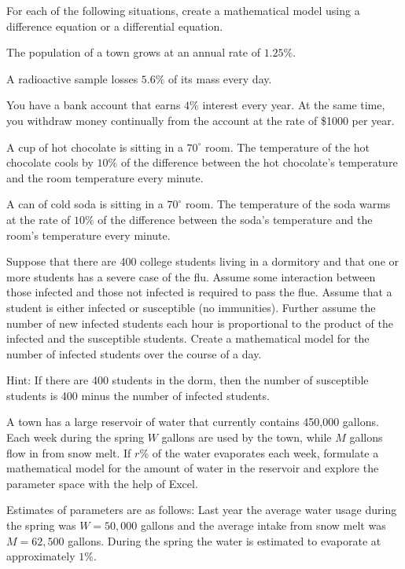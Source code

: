 \begin{problem}
    For each of the following situations, create a mathematical model using a difference
    equation or a differential equation.
\ba
\item The population of a town grows at an annual rate of $1.25\%$.
\item A radioactive sample losses $5.6\%$ of its mass every day.
\item  You have a bank account that earns $4\%$ interest every year. At the same time, you
    withdraw money continually from the account at the rate of \$1000 per year.
\item A cup of hot chocolate is sitting in a $70^\circ$ room. The temperature of the hot
    chocolate cools by $10\%$ of the difference between the hot chocolate's temperature and
    the room temperature every minute.
\item A can of cold soda is sitting in a $70^\circ$ room. The temperature of the soda warms at
    the rate of $10\%$ of the difference between the soda's temperature and the room's
    temperature every minute.
    \item Suppose that there are 400 college students living
        in a dormitory and that one or more students has a severe case of the flu.  Assume some
        interaction between those infected and those not infected is required to pass the
        flue.  Assume that a student is either infected or susceptible (no immunities).
        Further assume the number of new infected students each hour is proportional to
        the product of the infected and the susceptible students.  Create a mathematical
        model for the number of infected students over the course of a day.    

        Hint: If there are 400 students in the dorm, then the number of susceptible
        students is 400 minus the number of infected students.
    \item A town has a large reservoir of water that currently contains 450,000 gallons.
        Each week during the spring $W$ gallons are used by the town, while $M$
        gallons flow in from snow melt.  If $r$\% of the water evaporates each week,
        formulate a mathematical model for the amount of water in the reservoir and
        explore the parameter space with the help of Excel. 
        
        Estimates of parameters are as follows: Last year the average water usage during
        the spring was $W=50,000$ gallons and the average intake from snow melt was
        $M=62,500$ gallons.  During the spring the water is estimated to evaporate at
        approximately $1\%$.

\ea
\end{problem}



